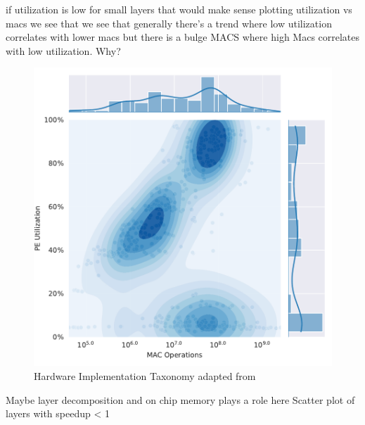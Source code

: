 if utilization is low for small layers that would make sense
plotting utilization vs macs we see that we see that generally there's a trend where low
utilization correlates with lower macs
but there is a bulge MACS where high Macs correlates
with low utilization. Why? 

\begin{figure}[ht]
    \centering
    \includegraphics[scale=0.58]{Plots/utilization/util_vs_macs.pdf}
    \caption{Hardware Implementation Taxonomy adapted from \cite{maestro}}
    \label{fig:hw_taxonomy}
\end{figure}


Maybe layer decomposition and on chip memory plays a role here
Scatter plot of layers with speedup < 1 

